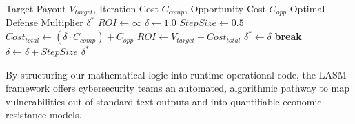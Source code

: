 \begin{algorithm}[h!]
\caption{Deterrence Optimization ($ADT$ Discovery)}
\label{alg:adt_discovery}
\begin{algorithmic}[1]
\REQUIRE Target Payout $V_{target}$, Iteration Cost $C_{comp}$, Opportunity Cost $C_{opp}$
\ENSURE Optimal Defense Multiplier $\delta^*$
\STATE $ROI \leftarrow \infty$
\STATE $\delta \leftarrow 1.0$ 
\STATE $StepSize \leftarrow 0.5$
    \STATE $Cost_{total} \leftarrow (\delta \cdot C_{comp}) + C_{opp}$
    \STATE $ROI \leftarrow V_{target} - Cost_{total}$
        \STATE $\delta^* \leftarrow \delta$
        \STATE \textbf{break}
    \ENDIF
    \STATE $\delta \leftarrow \delta + StepSize$
\ENDWHILE
\RETURN $\delta^*$
\end{algorithmic}
\end{algorithm}

By structuring our mathematical logic into runtime operational code, the LASM framework offers cybersecurity teams an automated, algorithmic pathway to map vulnerabilities out of standard text outputs and into quantifiable economic resistance models.
